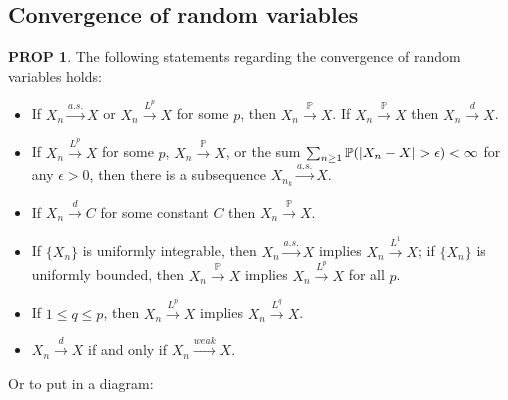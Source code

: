 \documentclass[hidelinks,11pt]{article}
\theoremstyle{definition}
\theoremstyle{dotless}
\newtheorem{prop}{PROP}[section]
\theoremstyle{remark}
\DeclareMathOperator{\1}{\mathbf{1}}
\begin{document}
\subsection{Convergence of random variables}

\begin{prop}
The following statements regarding the convergence of random variables holds:\begin{itemize}
    \item If $X_n\xrightarrow{a.s.}X$ or $X_n\xrightarrow{L^p}X$ for some $p$, then $X_n\xrightarrow{\mathbb{P}}X$. If $X_n\xrightarrow{\mathbb{P}}X$ then $X_n\xrightarrow{d}X$.
    \item If $X_n\xrightarrow{L^p}X$ for some $p$, $X_n\xrightarrow{\mathbb{P}}X$, or the sum $\sum_{n\geq1}\mathbb{P}(\abs{X_n-X}>\epsilon)<\infty$ for any $\epsilon>0$, then there is a subsequence $X_{n_k}\xrightarrow{a.s.}X$.
    \item If $X_n\xrightarrow{d}C$ for some constant $C$ then $X_n\xrightarrow{\mathbb{P}}X$.
    \item If $\{X_n\}$ is uniformly integrable, then $X_n\xrightarrow{a.s.}X$ implies $X_n\xrightarrow{L^1}X$; if $\{X_n\}$ is uniformly bounded, then $X_n\xrightarrow{\mathbb{P}}X$ implies $X_n\xrightarrow{L^p}X$ for all $p$.
    \item If $1\leq q\leq p$, then $X_n\xrightarrow{L^p}X$ implies $X_n\xrightarrow{L^q}X$.
    \item $X_n\xrightarrow{d}X$ if and only if $X_n\xrightarrow{weak}X$.
\end{itemize}
Or to put in a diagram:
\begin{center}\end{center}
\end{prop}
\end{document}
